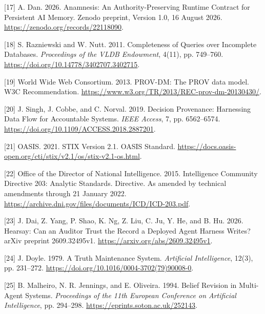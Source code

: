 \documentclass[acmlarge,review,anonymous,nonacm]{acmart}
\newlength{\cslhangindent}
\newlength{\cslentryspacingunit} %
\newenvironment{CSLReferences}[2] %
 {\bibliofont %
  \setlength{\parindent}{0pt}
  \ifodd #1
  \let\oldpar\par
  \def\par{\hangindent=\cslhangindent\oldpar}
  \fi
  \setlength{\parskip}{#2\cslentryspacingunit}
 }%
 {}
\begin{document}
\begin{CSLReferences}{1}{1}
\leavevmode{}%
{[}17{]} A. Dan. 2026. Anamnesis: An Authority-Preserving Runtime
Contract for Persistent AI Memory. Zenodo preprint, Version 1.0, 16
August 2026. \url{https://zenodo.org/records/22118090}.

\leavevmode{}%
{[}18{]} S. Razniewski and W. Nutt. 2011. Completeness of Queries over
Incomplete Databases. \emph{Proceedings of the VLDB Endowment}, 4(11),
pp. 749--760. \url{https://doi.org/10.14778/3402707.3402715}.

\leavevmode{}%
{[}19{]} World Wide Web Consortium. 2013. PROV-DM: The PROV data model.
W3C Recommendation.
\url{https://www.w3.org/TR/2013/REC-prov-dm-20130430/}.

\leavevmode{}%
{[}20{]} J. Singh, J. Cobbe, and C. Norval. 2019. Decision Provenance:
Harnessing Data Flow for Accountable Systems. \emph{IEEE Access}, 7, pp.
6562--6574. \url{https://doi.org/10.1109/ACCESS.2018.2887201}.

\leavevmode{}%
{[}21{]} OASIS. 2021. STIX Version 2.1. OASIS Standard.
\url{https://docs.oasis-open.org/cti/stix/v2.1/os/stix-v2.1-os.html}.

\leavevmode{}%
{[}22{]} Office of the Director of National Intelligence. 2015.
Intelligence Community Directive 203: Analytic Standards. Directive. As
amended by technical amendments through 21 January 2022.
\url{https://archive.dni.gov/files/documents/ICD/ICD-203.pdf}.

\leavevmode{}%
{[}23{]} J. Dai, Z. Yang, P. Shao, K. Ng, Z. Liu, C. Ju, Y. He, and B.
Hu. 2026. Hearsay: Can an Auditor Trust the Record a Deployed Agent
Harness Writes? arXiv preprint 2609.32495v1.
\url{https://arxiv.org/abs/2609.32495v1}.

\leavevmode{}%
{[}24{]} J. Doyle. 1979. A Truth Maintenance System. \emph{Artificial
Intelligence}, 12(3), pp. 231--272.
\url{https://doi.org/10.1016/0004-3702(79)90008-0}.

\leavevmode{}%
{[}25{]} B. Malheiro, N. R. Jennings, and E. Oliveira. 1994. Belief
Revision in Multi-Agent Systems. \emph{Proceedings of the 11th European
Conference on Artificial Intelligence}, pp. 294--298.
\url{https://eprints.soton.ac.uk/252143}.


\end{CSLReferences}
\end{document}
